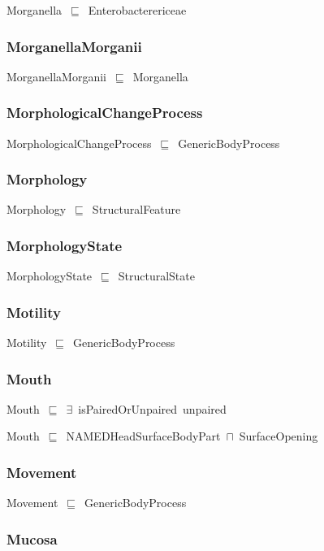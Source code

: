 \documentclass{article}
\begin{document}
Morganella~\ensuremath{\sqsubseteq}~Enterobacterericeae~

\subsubsection*{MorganellaMorganii}

MorganellaMorganii~\ensuremath{\sqsubseteq}~Morganella~

\subsubsection*{MorphologicalChangeProcess}

MorphologicalChangeProcess~\ensuremath{\sqsubseteq}~GenericBodyProcess~

\subsubsection*{Morphology}

Morphology~\ensuremath{\sqsubseteq}~StructuralFeature~

\subsubsection*{MorphologyState}

MorphologyState~\ensuremath{\sqsubseteq}~StructuralState~

\subsubsection*{Motility}

Motility~\ensuremath{\sqsubseteq}~GenericBodyProcess~

\subsubsection*{Mouth}

Mouth~\ensuremath{\sqsubseteq}~\ensuremath{\exists}~isPairedOrUnpaired~unpaired~

Mouth~\ensuremath{\sqsubseteq}~NAMEDHeadSurfaceBodyPart~\ensuremath{\sqcap}~SurfaceOpening~

\subsubsection*{Movement}

Movement~\ensuremath{\sqsubseteq}~GenericBodyProcess~

\subsubsection*{Mucosa}
\end{document}
